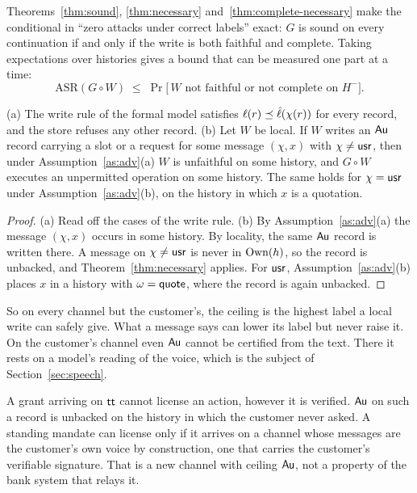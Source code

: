Theorems~\ref{thm:sound}, \ref{thm:necessary} and~\ref{thm:complete-necessary} make the
conditional in ``zero attacks under correct labels'' exact: $G$ is sound on every continuation if
and only if the write is both faithful and complete. Taking expectations over histories gives a
bound that can be measured one part at a time:
\[
\mathrm{ASR}(G \circ W) \;\leq\; \Pr\big[\,W \text{ not faithful or not complete on } H^{-}\big].
\]

\begin{theorem}\label{thm:ceiling}
(a) The write rule of the formal model satisfies $\ell(r) \preceq \hat\ell(\chi(r))$ for every record,
and the store refuses any other record.
(b) Let $W$ be local. If $W$ writes an $\mathsf{Au}$ record carrying a slot or a request for some message
$(\chi, x)$ with $\chi \neq \mathsf{usr}$, then under Assumption~\ref{as:adv}(a) $W$ is unfaithful on some
history, and $G \circ W$ executes an unpermitted operation on some history. The same holds for
$\chi = \mathsf{usr}$ under Assumption~\ref{as:adv}(b), on the history in which $x$ is a quotation.
\end{theorem}
\begin{proof}
(a) Read off the cases of the write rule. (b) By Assumption~\ref{as:adv}(a) the message
$(\chi, x)$ occurs in some history. By locality, the same $\mathsf{Au}$ record is written there. A message
on $\chi \neq \mathsf{usr}$ is never in $\mathrm{Own}(h)$, so the record is unbacked, and
Theorem~\ref{thm:necessary} applies. For $\mathsf{usr}$, Assumption~\ref{as:adv}(b) places $x$ in a history
with $\omega = \mathsf{quote}$, where the record is again unbacked.
\end{proof}

So on every channel but the customer's, the ceiling is the highest label a local write can safely
give. What a message says can lower its label but never raise it. On the customer's channel even
$\mathsf{Au}$ cannot be certified from the text. There it rests on a model's reading of the voice, which is
the subject of Section~\ref{sec:speech}.

\begin{corollary}[Grants]\label{cor:grant}
A grant arriving on $\mathsf{tt}$ cannot license an action, however it is verified. $\mathsf{Au}$ on such a
record is unbacked on the history in which the customer never asked. A standing mandate can
license only if it arrives on a channel whose messages are the customer's own voice by
construction, one that carries the customer's verifiable signature. That is a new channel with
ceiling $\mathsf{Au}$, not a property of the bank system that relays it.
\end{corollary}

